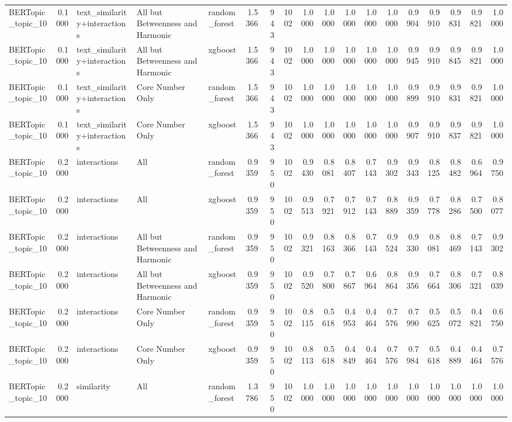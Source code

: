 \begin{tabular}{lrlllrrrrrrrrrrrrr}
BERTopic_topic_10 & 0.1000 & text_similarity+interactions & All but Betweenness and Harmonic & random_forest & 1.5366 & 943 & 1002 & 1.0000 & 1.0000 & 1.0000 & 1.0000 & 1.0000 & 0.9904 & 0.9910 & 0.9831 & 0.9821 & 1.0000 \\
BERTopic_topic_10 & 0.1000 & text_similarity+interactions & All but Betweenness and Harmonic & xgboost & 1.5366 & 943 & 1002 & 1.0000 & 1.0000 & 1.0000 & 1.0000 & 1.0000 & 0.9945 & 0.9910 & 0.9845 & 0.9821 & 1.0000 \\
BERTopic_topic_10 & 0.1000 & text_similarity+interactions & Core Number Only & random_forest & 1.5366 & 943 & 1002 & 1.0000 & 1.0000 & 1.0000 & 1.0000 & 1.0000 & 0.9899 & 0.9910 & 0.9831 & 0.9821 & 1.0000 \\
BERTopic_topic_10 & 0.1000 & text_similarity+interactions & Core Number Only & xgboost & 1.5366 & 943 & 1002 & 1.0000 & 1.0000 & 1.0000 & 1.0000 & 1.0000 & 0.9907 & 0.9910 & 0.9837 & 0.9821 & 1.0000 \\
BERTopic_topic_10 & 0.2000 & interactions & All & random_forest & 0.9359 & 950 & 1002 & 0.9430 & 0.8081 & 0.8407 & 0.7143 & 0.9302 & 0.9343 & 0.8125 & 0.8482 & 0.6964 & 0.9750 \\
BERTopic_topic_10 & 0.2000 & interactions & All & xgboost & 0.9359 & 950 & 1002 & 0.9513 & 0.7921 & 0.7912 & 0.7143 & 0.8889 & 0.9359 & 0.7778 & 0.8286 & 0.7500 & 0.8077 \\
BERTopic_topic_10 & 0.2000 & interactions & All but Betweenness and Harmonic & random_forest & 0.9359 & 950 & 1002 & 0.9321 & 0.8163 & 0.8366 & 0.7143 & 0.9524 & 0.9330 & 0.8081 & 0.8469 & 0.7143 & 0.9302 \\
BERTopic_topic_10 & 0.2000 & interactions & All but Betweenness and Harmonic & xgboost & 0.9359 & 950 & 1002 & 0.9520 & 0.7800 & 0.7867 & 0.6964 & 0.8864 & 0.9356 & 0.7664 & 0.8306 & 0.7321 & 0.8039 \\
BERTopic_topic_10 & 0.2000 & interactions & Core Number Only & random_forest & 0.9359 & 950 & 1002 & 0.8115 & 0.5618 & 0.4953 & 0.4464 & 0.7576 & 0.7990 & 0.5625 & 0.5072 & 0.4821 & 0.6750 \\
BERTopic_topic_10 & 0.2000 & interactions & Core Number Only & xgboost & 0.9359 & 950 & 1002 & 0.8113 & 0.5618 & 0.4849 & 0.4464 & 0.7576 & 0.7984 & 0.5618 & 0.4889 & 0.4464 & 0.7576 \\
BERTopic_topic_10 & 0.2000 & similarity & All & random_forest & 1.3786 & 950 & 1002 & 1.0000 & 1.0000 & 1.0000 & 1.0000 & 1.0000 & 1.0000 & 1.0000 & 1.0000 & 1.0000 & 1.0000 \\

\end{tabular}
